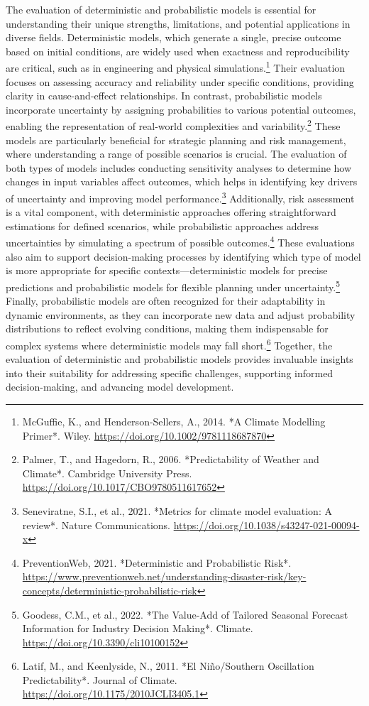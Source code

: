 The evaluation of deterministic and probabilistic models is essential for understanding their unique strengths, limitations, and potential applications in diverse fields. Deterministic models, which generate a single, precise outcome based on initial conditions, are widely used when exactness and reproducibility are critical, such as in engineering and physical simulations.\footnote{McGuffie, K., and Henderson-Sellers, A., 2014. *A Climate Modelling Primer*. Wiley. \url{https://doi.org/10.1002/9781118687870}} Their evaluation focuses on assessing accuracy and reliability under specific conditions, providing clarity in cause-and-effect relationships. In contrast, probabilistic models incorporate uncertainty by assigning probabilities to various potential outcomes, enabling the representation of real-world complexities and variability.\footnote{Palmer, T., and Hagedorn, R., 2006. *Predictability of Weather and Climate*. Cambridge University Press. \url{https://doi.org/10.1017/CBO9780511617652}} These models are particularly beneficial for strategic planning and risk management, where understanding a range of possible scenarios is crucial. The evaluation of both types of models includes conducting sensitivity analyses to determine how changes in input variables affect outcomes, which helps in identifying key drivers of uncertainty and improving model performance.\footnote{Seneviratne, S.I., et al., 2021. *Metrics for climate model evaluation: A review*. Nature Communications. \url{https://doi.org/10.1038/s43247-021-00094-x}} Additionally, risk assessment is a vital component, with deterministic approaches offering straightforward estimations for defined scenarios, while probabilistic approaches address uncertainties by simulating a spectrum of possible outcomes.\footnote{PreventionWeb, 2021. *Deterministic and Probabilistic Risk*. \url{https://www.preventionweb.net/understanding-disaster-risk/key-concepts/deterministic-probabilistic-risk}} These evaluations also aim to support decision-making processes by identifying which type of model is more appropriate for specific contexts—deterministic models for precise predictions and probabilistic models for flexible planning under uncertainty.\footnote{Goodess, C.M., et al., 2022. *The Value-Add of Tailored Seasonal Forecast Information for Industry Decision Making*. Climate. \url{https://doi.org/10.3390/cli10100152}} Finally, probabilistic models are often recognized for their adaptability in dynamic environments, as they can incorporate new data and adjust probability distributions to reflect evolving conditions, making them indispensable for complex systems where deterministic models may fall short.\footnote{Latif, M., and Keenlyside, N., 2011. *El Niño/Southern Oscillation Predictability*. Journal of Climate. \url{https://doi.org/10.1175/2010JCLI3405.1}} Together, the evaluation of deterministic and probabilistic models provides invaluable insights into their suitability for addressing specific challenges, supporting informed decision-making, and advancing model development.

